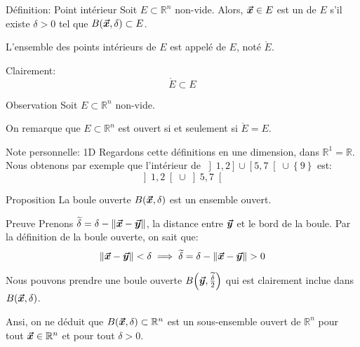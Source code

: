 \documentclass[a4paper]{article}
\begin{document}
\begin{parag}{Définition: Point intérieur}
    Soit $E \subset \mathbb{R}^n$ non-vide. Alors, $\bm{\protect\vec{x}} \in E$ est un  de $E$ s'il existe $\delta > 0$ tel que $B\left(\bvec{x}, \delta\right) \subset E$.

    L'ensemble des points intérieurs de $E$ est appelé  de $E$, noté $\mathring{E}$.

    Clairement: 
    \[\mathring{E} \subset E\]
    
    \begin{subparag}{Observation}
        Soit $E \subset\mathbb{R}^n$ non-vide.

        On remarque que $E \subset\mathbb{R}^n$ est ouvert si et seulement si $\mathring{E} = E$.
    \end{subparag}

    \begin{subparag}{Note personnelle: 1D}
        Regardons cette définitions en une dimension, dans $\mathbb{R}^1 = \mathbb{R}$. Nous obtenons par exemple que l'intérieur de $\left]1, 2\right] \cup \left[5, 7\right[ \cup \left\{9\right\}$ est: 
        \[\left]1, 2\right[ \cup \left]5, 7\right[ \]
    \end{subparag}
\end{parag}

\begin{parag}{Proposition}
    La boule ouverte $B\left(\bvec{x}, \delta\right)$ est un ensemble ouvert.

    \begin{subparag}{Preuve}
        Prenons $\widetilde{\delta} = \delta - \left\|\bvec{x} - \bvec{y}\right\|$, la distance entre $\bm{\protect\vec{y}}$ et le bord de la boule. Par la définition de la boule ouverte, on sait que:
        \[\left\|\bvec{x} - \bvec{y}\right\| < \delta \implies \widetilde{\delta} = \delta - \left\|\bvec{x} - \bvec{y}\right\| > 0\]

        Nous pouvons prendre une boule ouverte $B\left(\bvec{y}, \frac{\widetilde{\delta}}{2}\right)$ qui est clairement inclue dans $B\left(\bvec{x}, \delta\right)$.

        Ansi, on ne déduit que $B\left(\bvec{x}, \delta\right) \subset \mathbb{R}^n$ est un sous-ensemble ouvert de $\mathbb{R}^n$ pour tout $\bm{\protect\vec{x}}\in \mathbb{R}^n$ et pour tout $\delta > 0$.

    \end{subparag}
\end{parag}
\end{document}
